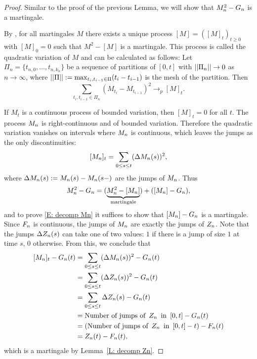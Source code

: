 \begin{proof} \label{P: decomp Mn}
	Similar to the proof of the previous Lemma, we will show that $M_n^2 - G_n$ is a martingale.
	
	By \cite[Theorem 21.70, p.471]{Klenke.2006}, 
	for all martingales $M$ there exists a unique process $[M] = ([M]_t)_{t\geq 0}$ with $[M]_0 = 0$ such that
	$M^2 - [M]$	is a martingale.
	This process is called the quadratic variation of $M$ and can be calculated as follows:
	Let $\Pi_n = \{ t_{n,0}, \dots, t_{n,k_n} \}$ be a sequence of partitions of $[0,t]$
	with $||\Pi_n|| \rightarrow 0$ as $n \rightarrow \infty$, 
	where $||\Pi|| := \max_{t_i, t_{i-1} \in \Pi} (t_i - t_{i-1})$ is the mesh of the partition.
	Then
	\begin{equation} \label{E: def quadratic variation}
		\sum_{t_i, t_{i-1} \in \Pi_n}(M_{t_i} - M_{t_{i-1}})^2 \rightarrow_p [M]_t.
	\end{equation}
	
	If $M_t$ is a continuous process of bounded variation, then $[M]_t = 0$ for all $t$.
	The process $M_n$ is right-continuous and of bounded variation.
	Therefore the quadratic variation vanishes on intervals where $M_n$ is continuous, 
	which leaves the jumps as the only discontinuities:
	\begin{equation}
	[M_n]_{t} = \sum_{0 \leq s \leq t} (\Delta M_n(s))^2,
	\end{equation}
	where $\Delta M_n(s) := M_n(s) - M_n(s-)$ are the jumps of $M_n$. \label{I: DeltaX}
	Thus
	\begin{equation}
	M_n^2 - G_n = (\underbrace{M_n^2 - [M_n]}_{\text{martingale}}) + ([M_n] - G_n),
	\end{equation}
	and to prove \eqref{E: decomp Mn} it suffices to show that $[M_n] - G_n$ is a martingale.
	Since $F_n$ is continuous, the jumps of $M_n$ are exactly the jumps of $Z_n$.
	Note that the jumps $\Delta Z_n(s)$ can take one of two values: 
	$1$ if there is a jump of size $1$ at time $s$, 0 otherwise.
	From this, we conclude that
	\begin{align*}
	[M_n]_{t} - G_n(t)
	&= \sum_{0 \leq s \leq t} (\Delta M_n(s))^2 - G_n(t) \\
	&= \sum_{0 \leq s \leq t} (\Delta Z_n(s))^2 - G_n(t) \\
	&= \sum_{0 \leq s \leq t} \Delta Z_n(s) - G_n(t) \\
	&= \text{Number of jumps of} \enspace Z_n \enspace \text{in} \enspace [0,t] - G_n(t) \\
	&= (\text{Number of jumps of} \enspace Z_n \enspace \text{in} \enspace [0,t] - t) - F_n(t) \\
	&= Z_n(t) - F_n(t),
	\end{align*}
	which is a martingale by Lemma~\ref{L: decomp Zn}.
\end{proof}





